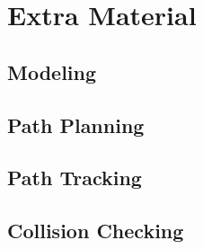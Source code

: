 \section{Extra Material}

\subsection{Modeling}

\subsection{Path Planning}

\subsection{Path Tracking}

\subsection{Collision Checking}

